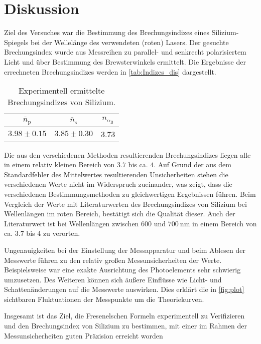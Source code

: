 \section{Diskussion}
\label{sec:Diskussion}
Ziel des Versuches war die Bestimmung des Brechungsindizes eines Silizium-Spiegels bei der Wellelänge des verwendeten (roten) Lasers. 
Der gesuchte Brechungsindex wurde aus Messreihen zu parallel- und senkrecht polarisiertem Licht und über Bestimmung des Brewsterwinkels ermittelt.
Die Ergebnisse der errechneten Brechungsindizes werden in \autoref{tab:Indizes_dis} dargestellt. 

\begin{table}
  \centering
  \caption{Experimentell ermittelte Brechungsindizes von Silizium.}
  \label{tab:Indizes_dis}
  \begin{tabular}{c c c}
    \toprule
      {$\overline{n}_\text{p}$} & {$\overline{n}_\text{s}$} & {$n_{\alpha_\text{B}}$} \\
      \midrule
      $3.98 \pm 0.15$ & $3.85 \pm 0.30$ & 3.73 \\
    \bottomrule
  \end{tabular}
\end{table}

Die aus den verschiedenen Methoden resultierenden Brechungsindizes liegen alle in einem relativ kleinen Bereich von $\num{3.7}$ bis ca. $4$. 
Auf Grund der aus dem Standardfehler des Mittelwertes
resultierenden Unsicherheiten stehen die verschiedenen Werte nicht im Widerspruch zueinander, was zeigt, dass die verschiedenen Bestimmungsmethoden
zu gleichwertigen Ergebnissen führen.
Beim Vergleich der Werte mit Literaturwerten des Brechungsindizes von Silizium bei Wellenlängen im roten Bereich, bestätigt sich die Qualität dieser. Auch der Literaturwert 
ist bei Wellenlängen zwischen $\num{600}$ und $\qty{700}{\nano\metre}$ in einem Bereich von ca. $\num{3.7}$ bis $4$ zu verorten.

Ungenauigkeiten bei der Einstellung der Messapparatur und beim Ablesen der Messwerte führen zu den relativ großen Messunsicherheiten der Werte. Beispielsweise war eine exakte
Ausrichtung des Photoelements sehr schwierig umzusetzen. Des Weiteren können sich äußere Einflüsse wie Licht- und Schattenänderungen auf die Messwerte auswirken.
Dies erklärt die in \autoref{fig:plot} sichtbaren Fluktuationen der Messpunkte um die Theoriekurven.

Insgesamt ist das Ziel, die Fresenelschen Formeln experimentell zu Verifizieren und den Brechungsindex von Silizium zu bestimmen, mit einer im Rahmen der Messunsicherheiten
guten Präzision erreicht worden
